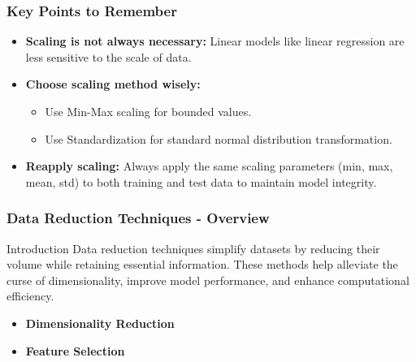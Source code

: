 \documentclass[aspectratio=169]{beamer}
\begin{document}
\begin{frame}[fragile]
    \frametitle{Key Points to Remember}
    \begin{itemize}
        \item \textbf{Scaling is not always necessary:} Linear models like linear regression are less sensitive to the scale of data.
        \item \textbf{Choose scaling method wisely:} 
        \begin{itemize}
            \item Use Min-Max scaling for bounded values.
            \item Use Standardization for standard normal distribution transformation.
        \end{itemize}
        \item \textbf{Reapply scaling:} Always apply the same scaling parameters (min, max, mean, std) to both training and test data to maintain model integrity.
    \end{itemize}
\end{frame}

\begin{frame}[fragile]
    \frametitle{Data Reduction Techniques - Overview}
    \begin{block}{Introduction}
        Data reduction techniques simplify datasets by reducing their volume while retaining essential information. These methods help alleviate the curse of dimensionality, improve model performance, and enhance computational efficiency.
    \end{block}
    
    \begin{itemize}
        \item \textbf{Dimensionality Reduction}
        \item \textbf{Feature Selection}
    \end{itemize}
\end{frame}
\end{document}
